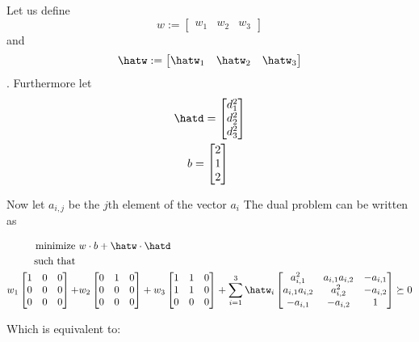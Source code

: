 \documentclass{article} %
\newcommand{\h}[1]{\expandafter\hat#1}
\begin{document}
\begin{enumerate}
\begin{itemize}
Let us define \[ w:= \begin{bmatrix} w_1 & w_2 & w_3 \end{bmatrix}\] and \[ \h{w} := \begin{bmatrix} \h{w_1} & \h{w_2} & \h{w_3} \end{bmatrix} \]. 
Furthermore let  \begin{gather*}
\h{d} = \begin{bmatrix} d_1^2 \\ d_2^2 \\ d_3^2 \end{bmatrix} \\ 
b = \begin{bmatrix} 2 \\ 1 \\  2 \end{bmatrix} \
\end{gather*}


Now let $a_{i,j}$ be the $j$th element of the vector $a_i$
The dual problem can be written as 


\begin{equation*}
\begin{aligned}
\mbox{ minimize } & w \cdot b + \h{w} \cdot \h{d} \\ 
\mbox{ such that } & \\ 
w_1 \begin{bmatrix} 1 & 0 & 0 \\ 0 & 0 & 0 \\ 0 & 0 & 0 \end{bmatrix} +  & w_2 \begin{bmatrix} 0 & 1 & 0 \\ 0 & 0 & 0 \\ 0 & 0 & 0 \end{bmatrix} + 
 w_3 \begin{bmatrix} 1 & 1 & 0 \\ 1 & 1 & 0 \\ 0 & 0 & 0 \end{bmatrix} + 
  \sum_{i=1}^{3} \h{w_i} \begin{bmatrix} a_{i,1}^2 & a_{i,1} a_{i,2} & - a_{i,1} \\  a_{i,1} a_{i,2} & a_{i,2}^2 & - a_{i,2} \\ - a_{i,1} & - a_{i,2}  & 1 \end{bmatrix} \succeq 0 
\end{aligned}
\end{equation*}


Which is equivalent to: 



\end{itemize}
\end{enumerate}
\end{document}
